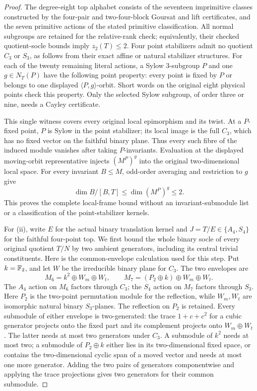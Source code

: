 \begin{proof}
The degree-eight top alphabet consists of the seventeen imprimitive
classes constructed by the four-pair and two-four-block Goursat and
lift certificates, and the seven primitive actions of the stated
primitive classification. All normal subgroups are retained for the
relative-rank check; equivalently, their checked quotient-socle bounds
imply $z_2(T)\leq2$. Four point stabilizers admit no quotient $C_3$
or $S_3$, as follows from their exact affine or natural stabilizer
structures. For each of the twenty remaining literal actions, a Sylow
$3$-subgroup $P$ and one $g\in N_T(P)$ have the following point property:
every point is fixed by $P$ or belongs to one displayed
$\langle P,g\rangle$-orbit. Short words on the original eight physical
points check this property. Only the selected Sylow subgroup, of order
three or nine, needs a Cayley certificate.

This single witness covers every original local epimorphism and its twist.
At a $P$-fixed point, $P$ is Sylow in the point stabilizer; its local
image is the full $C_3$, which has no fixed vector on the faithful binary
plane. Thus every such fibre of the induced module vanishes after taking
$P$-invariants. Evaluation at the displayed moving-orbit representative
injects $(M^P)^g$ into the original two-dimensional local space.
For every invariant $B\leq M$, odd-order averaging and restriction to
$g$ give
\[
 \dim B/[B,T]\leq\dim(M^P)^g\leq2.
\]
This proves the complete local-frame bound without an invariant-submodule
list or a classification of the point-stabilizer kernels.

For (ii), write $E$ for the actual binary translation kernel and
$J=T/E\in\{A_4,S_4\}$ for the faithful four-point top. We first
bound the whole binary socle of every original quotient $T/N$ by
two ambient generators, including its central trivial constituents.
Here is the common-envelope calculation used for this step.
Put $k=\mathbb F_2$, and let $W$ be the irreducible binary plane for $C_3$.
The two envelopes are
\[
 M_6=k^2\oplus W_m\oplus W_t,\qquad
 M_7=(P_2\oplus k)\oplus W_m\oplus W_t.
\]
The $A_4$ action on $M_6$ factors through $C_3$; the $S_4$ action
on $M_7$ factors through $S_3$. Here $P_2$ is the two-point
permutation module for the reflection, while $W_m,W_t$ are
isomorphic natural binary $S_3$-planes. The reflection on $P_2$
is retained. Every submodule of either envelope is two-generated:
the trace $1+c+c^2$ for a cubic generator projects onto the fixed
part and its complement projects onto $W_m\oplus W_t$. The latter
needs at most two generators under $C_3$. A submodule of $k^2$
needs at most two; a submodule of $P_2\oplus k$ either lies in its
two-dimensional fixed space, or contains the two-dimensional cyclic
span of a moved vector and needs at most one more generator.
Adding the two pairs of generators componentwise and applying the
trace projections gives two generators for their common submodule.


\end{proof}
